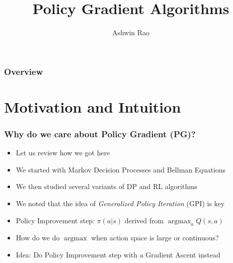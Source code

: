 \documentclass[handout]{beamer}
\title[Policy Gradient Algorithms]{Policy Gradient Algorithms} %
\author{Ashwin Rao} %
\institute[Stanford] %
{ICME, Stanford University
}
\date{} %
\DeclareMathOperator*{\argmax}{argmax}
\begin{document}
\begin{frame}
\titlepage %
\end{frame}

\begin{frame}
\frametitle{Overview} %
\tableofcontents %
\end{frame}

\section{Motivation and Intuition}


\begin{frame}
\frametitle{Why do we care about Policy Gradient (PG)?}
\pause
\begin{itemize}[<+->]
\item Let us review how we got here
\item We started with Markov Decision Processes and Bellman Equations
\item We then studied several variants of DP and RL algorithms
\item We noted that the idea of {\em Generalized Policy Iteration} (GPI) is key
\item Policy Improvement step: $\pi(a|s)$ derived from $\argmax_a Q(s, a)$
\item How do we do $\argmax$ when action space is large or continuous?
\item Idea: Do Policy Improvement step with a Gradient Ascent instead
\end{itemize}
\end{frame}
\end{document}
